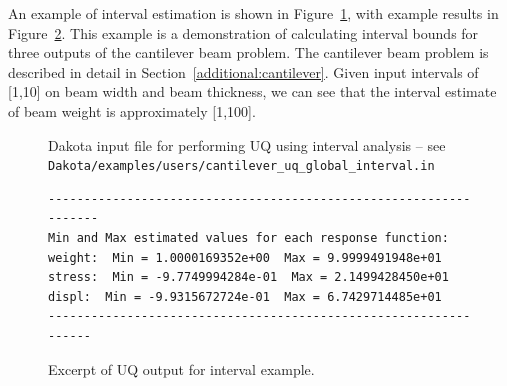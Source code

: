 

 
An example of interval estimation 
is shown in Figure~\ref{uq:examples:interval_input}, with example results in 
Figure~\ref{uq:examples:interval_out}. This example is a demonstration 
of calculating interval bounds for three outputs of the cantilever beam 
problem. The cantilever beam problem is described in detail in 
Section~\ref{additional:cantilever}. Given input intervals of [1,10] on 
beam width and beam thickness, we can see that the interval estimate of 
beam weight is approximately [1,100].

\begin{figure}[htbp!]
  \centering
  \begin{bigbox}
    \begin{small}
    \end{small}
  \end{bigbox}
\caption{Dakota input file for performing UQ using interval analysis --
see \texttt{Dakota/examples/users/cantilever\_uq\_global\_interval.in} }
\label{uq:examples:interval_input}
\end{figure}

\begin{figure}[htbp!]
\centering
\begin{bigbox}
\begin{small}
\begin{verbatim}
------------------------------------------------------------------
Min and Max estimated values for each response function:
weight:  Min = 1.0000169352e+00  Max = 9.9999491948e+01
stress:  Min = -9.7749994284e-01  Max = 2.1499428450e+01
displ:  Min = -9.9315672724e-01  Max = 6.7429714485e+01
-----------------------------------------------------------------
\end{verbatim}
\end{small}
\end{bigbox}
\caption{Excerpt of UQ output for interval example.}
\label{uq:examples:interval_out}
\end{figure}



